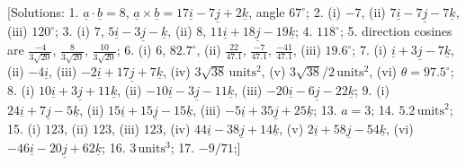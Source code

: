 \documentclass[
  11pt,
  oneside]{book}
\theoremstyle{definition}
\theoremstyle{definition}
\theoremstyle{definition}
\theoremstyle{definition}
\theoremstyle{remark}
\begin{document}
{[}Solutions:
1. \(\underline{a}\cdot\underline{b}=8\), \(\underline{a}\times\underline{b} = 17\underline{i}-7\underline{j}+2\underline{k}\), angle \(67^{\circ}\);
2. (i) \(-7\), (ii) \(7\underline{i}-7\underline{j}-7\underline{k}\), (iii) \(120^{\circ}\);
3. (i) \(7\), \(5\underline{i}-3\underline{j}-\underline{k}\), (ii) \(8\), \(11\underline{i}+18\underline{j}-19\underline{k}\);
4. \(118^{\circ}\);
5. direction cosines are \(\frac{-4}{3\sqrt{20}}\), \(\frac{8}{3\sqrt{20}}\), \(\frac{10}{3\sqrt{20}}\);
6. (i) \(6\), \(82.7^{\circ}\), (ii) \(\frac{22}{47.1}\), \(\frac{-7}{47.1}\), \(\frac{-41}{47.1}\), (iii) \(19.6^{\circ}\);
7. (i) \(\underline{i}+3\underline{j}-7\underline{k}\), (ii) \(-4\underline{i}\), (iii) \(-2\underline{i}+17\underline{j}+7\underline{k}\), (iv) \(3\sqrt{38}\,\text{units}^2\), (v) \(3\sqrt{38}/2\,\text{units}^2\), (vi) \(\theta=97.5^{\circ}\);
8. (i) \(10\underline{i}+3\underline{j}+11\underline{k}\), (ii) \(-10\underline{i}-3\underline{j}-11\underline{k}\), (iii) \(-20\underline{i}-6\underline{j}-22\underline{k}\);
9. (i) \(24\underline{i}+7\underline{j}-5\underline{k}\), (ii) \(15\underline{i}+15\underline{j}-15\underline{k}\), (iii) \(-5\underline{i}+35\underline{j}+25\underline{k}\);
13. \(a=3\);
14. \(5.2\,\text{units}^2\);
15. (i) \(123\), (ii) \(123\), (iii) \(123\), (iv) \(44\underline{i}-38\underline{j}+14\underline{k}\), (v) \(2\underline{i}+58\underline{j}-54\underline{k}\), (vi) \(-46\underline{i} -20\underline{j}+62\underline{k}\);
16. \(3\,\text{units}^3\);
17. \(-9/71\);{]}

\cleardoublepage
{}
\printindex
\end{document}
